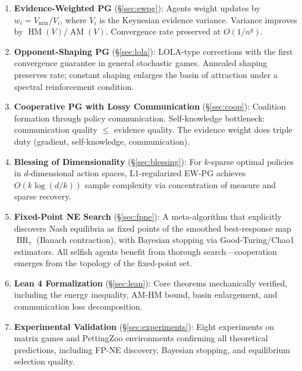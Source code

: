 \documentclass[11pt,a4paper]{article}
\DeclareMathOperator{\AM}{AM}
\DeclareMathOperator{\HM}{HM}
\DeclareMathOperator{\BR}{BR}
\begin{document}
\begin{enumerate}
    \item \textbf{Evidence-Weighted PG} (\S\ref{sec:ewpg}):
    Agents weight updates by $w_i = V_{\min}/V_i$, where $V_i$ is the
    Keynesian evidence variance. Variance improves by $\HM(V)/\AM(V)$.
    Convergence rate preserved at $O(1/n^q)$.

    \item \textbf{Opponent-Shaping PG} (\S\ref{sec:lola}):
    LOLA-type corrections with the first convergence guarantee in
    general stochastic games. Annealed shaping preserves rate;
    constant shaping enlarges the basin of attraction under a spectral
    reinforcement condition.

    \item \textbf{Cooperative PG with Lossy Communication} (\S\ref{sec:coop}):
    Coalition formation through policy communication. Self-knowledge
    bottleneck: communication quality $\leq$ evidence quality.
    The evidence weight does triple duty (gradient, self-knowledge,
    communication).

    \item \textbf{Blessing of Dimensionality} (\S\ref{sec:blessing}):
    For $k$-sparse optimal policies in $d$-dimensional action spaces,
    L1-regularized EW-PG achieves $O(k \log(d/k))$ sample complexity
    via concentration of measure and sparse recovery.

    \item \textbf{Fixed-Point NE Search} (\S\ref{sec:fpne}):
    A meta-algorithm that explicitly discovers Nash equilibria as fixed
    points of the smoothed best-response map $\BR_\tau$ (Banach contraction),
    with Bayesian stopping via Good-Turing/Chao1 estimators. All selfish
    agents benefit from thorough search---cooperation emerges from the
    topology of the fixed-point set.

    \item \textbf{Lean 4 Formalization} (\S\ref{sec:lean}):
    Core theorems mechanically verified, including the energy inequality,
    AM-HM bound, basin enlargement, and communication loss decomposition.

    \item \textbf{Experimental Validation} (\S\ref{sec:experiments}):
    Eight experiments on matrix games and PettingZoo environments
    confirming all theoretical predictions, including FP-NE discovery,
    Bayesian stopping, and equilibrium selection quality.
\end{enumerate}
\end{document}
